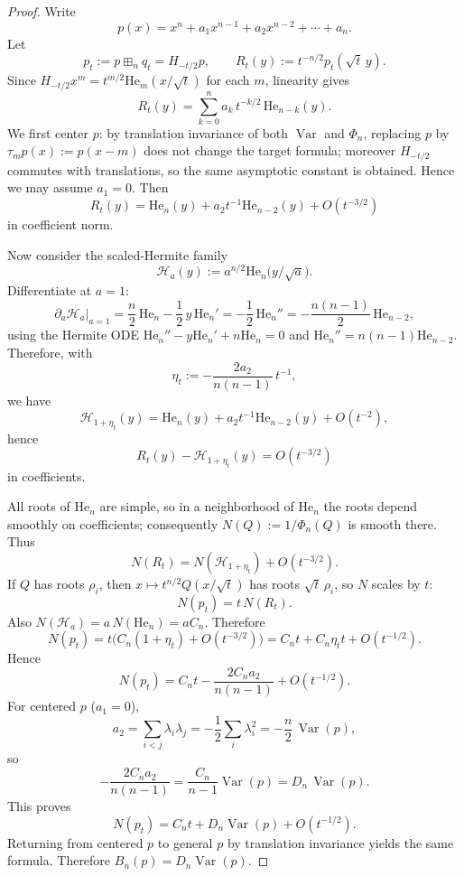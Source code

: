 \begin{proof}
Write
\[
p(x)=x^n+a_1x^{n-1}+a_2x^{n-2}+\cdots+a_n.
\]
Let
\[
p_t:=p\boxplus_n q_t = H_{-t/2}p,
\qquad
R_t(y):=t^{-n/2}p_t(\sqrt t\,y).
\]
Since $H_{-t/2}x^m=t^{m/2}\mathrm{He}_m(x/\sqrt t)$ for each $m$,
linearity gives
\[
R_t(y)=\sum_{k=0}^n a_k\,t^{-k/2}\,\mathrm{He}_{n-k}(y).
\]
We first center $p$: by translation invariance of both $\operatorname{Var}$ and
$\Phi_n$, replacing $p$ by $\tau_m p(x):=p(x-m)$ does not change the target
formula; moreover $H_{-t/2}$ commutes with translations, so the same asymptotic
constant is obtained. Hence we may assume $a_1=0$.
Then
\[
R_t(y)=\mathrm{He}_n(y)+a_2 t^{-1}\mathrm{He}_{n-2}(y)+O(t^{-3/2})
\]
in coefficient norm.

Now consider the scaled-Hermite family
\[
\mathcal H_a(y):=a^{n/2}\mathrm{He}_n\!\bigl(y/\sqrt a\bigr).
\]
Differentiate at $a=1$:
\[
\partial_a \mathcal H_a\big|_{a=1}
=
\frac n2\,\mathrm{He}_n-\frac12\,y\,\mathrm{He}_n'
=
-\frac12\,\mathrm{He}_n''
=
-\frac{n(n-1)}2\,\mathrm{He}_{n-2},
\]
using the Hermite ODE
$\mathrm{He}_n''-y\mathrm{He}_n'+n\mathrm{He}_n=0$
and $\mathrm{He}_n''=n(n-1)\mathrm{He}_{n-2}$.
Therefore, with
\[
\eta_t:=-\frac{2a_2}{n(n-1)}\,t^{-1},
\]
we have
\[
\mathcal H_{1+\eta_t}(y)
=
\mathrm{He}_n(y)+a_2 t^{-1}\mathrm{He}_{n-2}(y)+O(t^{-2}),
\]
hence
\[
R_t(y)-\mathcal H_{1+\eta_t}(y)=O(t^{-3/2})
\]
in coefficients.

All roots of $\mathrm{He}_n$ are simple, so in a neighborhood of $\mathrm{He}_n$
the roots depend smoothly on coefficients; consequently
$N(Q):=1/\Phi_n(Q)$ is smooth there. Thus
\[
N(R_t)=N(\mathcal H_{1+\eta_t})+O(t^{-3/2}).
\]
If $Q$ has roots $\rho_i$, then $x\mapsto t^{n/2}Q(x/\sqrt t)$ has roots
$\sqrt t\,\rho_i$, so $N$ scales by $t$:
\[
N(p_t)=t\,N(R_t).
\]
Also $N(\mathcal H_a)=a\,N(\mathrm{He}_n)=aC_n$. Therefore
\[
N(p_t)
=
t\Big(C_n(1+\eta_t)+O(t^{-3/2})\Big)
=
C_nt + C_n\eta_t t + O(t^{-1/2}).
\]
Hence
\[
N(p_t)=C_nt-\frac{2C_n a_2}{n(n-1)}+O(t^{-1/2}).
\]
For centered $p$ ($a_1=0$),
\[
a_2=\sum_{i<j}\lambda_i\lambda_j
=
-\frac12\sum_i\lambda_i^2
=
-\frac n2\,\operatorname{Var}(p),
\]
so
\[
-\frac{2C_n a_2}{n(n-1)}
=
\frac{C_n}{n-1}\operatorname{Var}(p)
=
D_n\,\operatorname{Var}(p).
\]
This proves
\[
N(p_t)=C_n t+D_n\operatorname{Var}(p)+O(t^{-1/2}).
\]
Returning from centered $p$ to general $p$ by translation invariance yields the
same formula. Therefore $B_n(p)=D_n\operatorname{Var}(p)$.
\end{proof}

